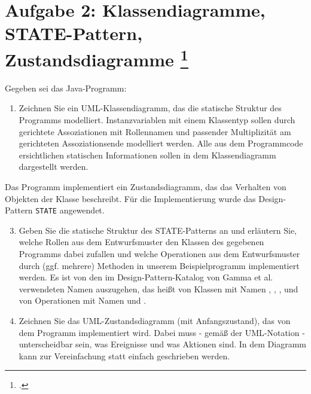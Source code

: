 \documentclass{lehramt-informatik-aufgabe}
\begin{document}

\section{Aufgabe 2: Klassendiagramme, STATE-Pattern, Zustandsdiagramme
\footcite{examen:66116:2018:09}}

Gegeben sei das Java-Programm:


\begin{enumerate}


\item Zeichnen Sie ein UML-Klassendiagramm, das
die statische Struktur des Programms modelliert. Instanzvariablen mit
einem Klassentyp sollen durch gerichtete Assoziationen mit Rollennamen
und passender Multiplizität am gerichteten Assoziationsende modelliert
werden. Alle aus dem Programmcode ersichtlichen statischen Informationen
sollen in dem Klassendiagramm dargestellt werden.

\end{enumerate}

\noindent
Das Programm implementiert ein Zustandsdiagramm,
das das Verhalten von Objekten der Klasse  beschreibt.
Für die Implementierung wurde das Design-Pattern \texttt{STATE}
angewendet.

\begin{enumerate}
\setcounter{enumi}{2}


\item Geben Sie die statische Struktur des STATE-Patterns an und erläutern Sie, welche Rollen aus dem Entwurfsmuster den
Klassen des gegebenen Programms dabei zufallen und welche Operationen
aus dem Entwurfsmuster durch (ggf. mehrere) Methoden in unserem
Beispielprogramm implementiert werden. Es ist von den \zB im
Design-Pattern-Katalog von Gamma et al. verwendeten Namen auszugehen,
das heißt von Klassen mit Namen ,
, ,
 und von Operationen mit Namen
 und .

\item Zeichnen Sie das UML-Zustandsdiagramm (mit Anfangszustand), das
von dem Programm implementiert wird. Dabei muss - gemäß der UML-Notation
- unterscheidbar sein, was Ereignisse und was Aktionen sind. In dem
Diagramm kann zur Vereinfachung statt  einfach  geschrieben werden.
\end{enumerate}
\end{document}
